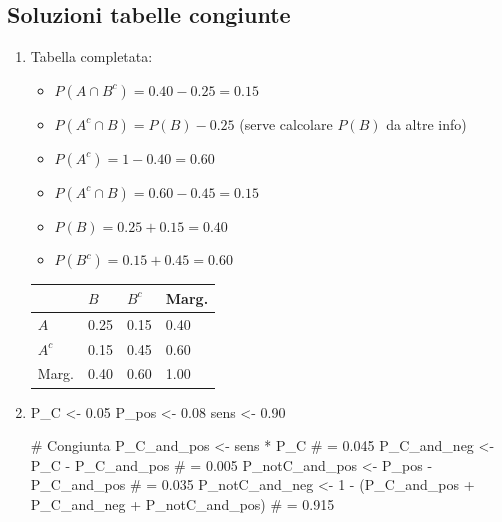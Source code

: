 \documentclass[
  letterpaper,
  DIV=11,
  numbers=noendperiod,
  oneside]{scrreprt}
\newenvironment{Shaded}{\begin{snugshade}}{\end{snugshade}}
\newcommand{\CommentTok}[1]{\textcolor[rgb]{0.37,0.37,0.37}{#1}}
\newcommand{\DecValTok}[1]{\textcolor[rgb]{0.68,0.00,0.00}{#1}}
\newcommand{\FloatTok}[1]{\textcolor[rgb]{0.68,0.00,0.00}{#1}}
\newcommand{\NormalTok}[1]{\textcolor[rgb]{0.00,0.23,0.31}{#1}}
\newcommand{\OtherTok}[1]{\textcolor[rgb]{0.00,0.23,0.31}{#1}}
\newcommand{\SpecialCharTok}[1]{\textcolor[rgb]{0.37,0.37,0.37}{#1}}
\providecommand{\tightlist}{%
  \setlength{\itemsep}{0pt}\setlength{\parskip}{0pt}}
\theoremstyle{definition}
\theoremstyle{plain}
\theoremstyle{definition}
\theoremstyle{remark}
\begin{document}
\begin{tcolorbox}
\subsection{Soluzioni tabelle
congiunte}\label{soluzioni-tabelle-congiunte}

\begin{enumerate}
\def\labelenumi{\arabic{enumi}.}
\setcounter{enumi}{6}
\item
  Tabella completata:

  \begin{itemize}
  \tightlist
  \item
    \(P(A \cap B^c) = 0.40 - 0.25 = 0.15\)
  \item
    \(P(A^c \cap B) = P(B) - 0.25\) (serve calcolare \(P(B)\) da altre
    info)
  \item
    \(P(A^c) = 1 - 0.40 = 0.60\)
  \item
    \(P(A^c \cap B) = 0.60 - 0.45 = 0.15\)
  \item
    \(P(B) = 0.25 + 0.15 = 0.40\)
  \item
    \(P(B^c) = 0.15 + 0.45 = 0.60\)
  \end{itemize}

  \begin{longtable}[]{@{}llll@{}}
  \toprule\noalign{}
  & \(B\) & \(B^c\) & Marg. \\
  \midrule\noalign{}
  \endhead
  \bottomrule\noalign{}
  \endlastfoot
  \(A\) & 0.25 & 0.15 & 0.40 \\
  \(A^c\) & 0.15 & 0.45 & 0.60 \\
  Marg. & 0.40 & 0.60 & 1.00 \\
  \end{longtable}
\item
\begin{Shaded}
\begin{Highlighting}[]
\NormalTok{P\_C }\OtherTok{\textless{}{-}} \FloatTok{0.05}
\NormalTok{P\_pos }\OtherTok{\textless{}{-}} \FloatTok{0.08}
\NormalTok{sens }\OtherTok{\textless{}{-}} \FloatTok{0.90}

\CommentTok{\# Congiunta}
\NormalTok{P\_C\_and\_pos }\OtherTok{\textless{}{-}}\NormalTok{ sens }\SpecialCharTok{*}\NormalTok{ P\_C  }\CommentTok{\# = 0.045}
\NormalTok{P\_C\_and\_neg }\OtherTok{\textless{}{-}}\NormalTok{ P\_C }\SpecialCharTok{{-}}\NormalTok{ P\_C\_and\_pos  }\CommentTok{\# = 0.005}
\NormalTok{P\_notC\_and\_pos }\OtherTok{\textless{}{-}}\NormalTok{ P\_pos }\SpecialCharTok{{-}}\NormalTok{ P\_C\_and\_pos  }\CommentTok{\# = 0.035}
\NormalTok{P\_notC\_and\_neg }\OtherTok{\textless{}{-}} \DecValTok{1} \SpecialCharTok{{-}}\NormalTok{ (P\_C\_and\_pos }\SpecialCharTok{+}\NormalTok{ P\_C\_and\_neg }\SpecialCharTok{+}\NormalTok{ P\_notC\_and\_pos)  }\CommentTok{\# = 0.915}


\end{Highlighting}
\end{Shaded}
\end{enumerate}
\end{tcolorbox}
\end{document}
